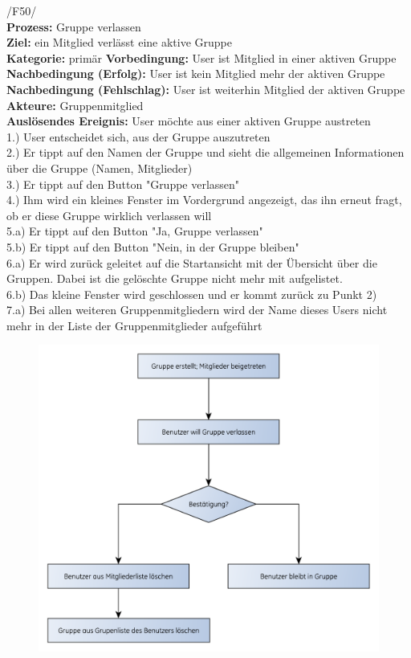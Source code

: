 /F50/\\
\textbf{Prozess:} Gruppe verlassen\\
\textbf{Ziel:} ein Mitglied verlässt eine aktive Gruppe\\
\textbf{Kategorie:} primär
\textbf{Vorbedingung:} User ist Mitglied in einer aktiven Gruppe
\textbf{Nachbedingung (Erfolg):} User ist kein Mitglied mehr der aktiven Gruppe\\
\textbf{Nachbedingung (Fehlschlag):} User ist weiterhin Mitglied der aktiven Gruppe\\
\textbf{Akteure:} Gruppenmitglied\\
\textbf{Auslösendes Ereignis:} User möchte aus einer aktiven Gruppe austreten\\
1.) User entscheidet sich, aus der Gruppe auszutreten\\
2.) Er tippt auf den Namen der Gruppe und sieht die allgemeinen Informationen über die Gruppe (Namen, Mitglieder)\\
3.) Er tippt auf den Button "Gruppe verlassen"\\
4.) Ihm wird ein kleines Fenster im Vordergrund angezeigt, das ihn erneut fragt, ob er diese Gruppe wirklich verlassen will\\
5.a) Er tippt auf den Button "Ja, Gruppe verlassen"\\
5.b) Er tippt auf den Button "Nein, in der Gruppe bleiben"\\
6.a) Er wird zurück geleitet auf die Startansicht mit der Übersicht über die Gruppen. Dabei ist die gelöschte Gruppe nicht mehr mit aufgelistet.\\
6.b) Das kleine Fenster wird geschlossen und er kommt zurück zu Punkt 2)\\
7.a) Bei allen weiteren Gruppenmitgliedern wird der Name dieses Users nicht mehr in der Liste der Gruppenmitglieder aufgeführt\\

\begin{figure} [H]
	\centering
	\includegraphics[scale=0.7]{./res/F50_gruppe_verlassen_flowgraph.pdf}
\end{figure}

